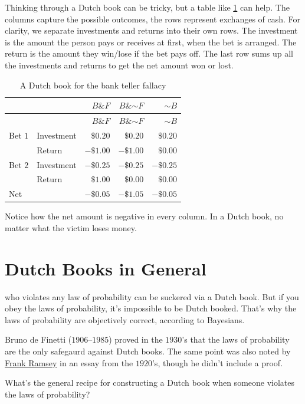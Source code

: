 \documentclass[justified]{tufte-book}
\renewcommand{\neg}{\mathbin{\sim}}
\renewcommand{\wedge}{\mathbin{\&}}
\theoremstyle{definition}
\theoremstyle{definition}
\theoremstyle{definition}
\theoremstyle{remark}
\begin{document}
Thinking through a Dutch book can be tricky, but a table like
\ref{tab:banktellerdb} can help. The columns capture the possible
outcomes, the rows represent exchanges of cash. For clarity, we separate
investments and returns into their own rows. The investment is the
amount the person pays or receives at first, when the bet is arranged.
The return is the amount they win/lose if the bet pays off. The last row
sums up all the investments and returns to get the net amount won or
lost.

\begin{longtable}[]{@{}llrrr@{}}
\caption{\label{tab:banktellerdb}A Dutch book for the bank teller
fallacy}\tabularnewline
\toprule
& & \(B \wedge F\) & \(B \wedge \neg F\) & \(\neg B\)\tabularnewline
\midrule
\endfirsthead
\toprule
& & \(B \wedge F\) & \(B \wedge \neg F\) & \(\neg B\)\tabularnewline
\midrule
\endhead
Bet \(1\) & Investment & \(\$0.20\) & \(\$0.20\) &
\(\$0.20\)\tabularnewline
& Return & \(-\$1.00\) & \(-\$1.00\) & \(\$0.00\)\tabularnewline
Bet \(2\) & Investment & \(-\$0.25\) & \(-\$0.25\) &
\(-\$0.25\)\tabularnewline
& Return & \(\$1.00\) & \(\$0.00\) & \(\$0.00\)\tabularnewline
Net & & \(-\$0.05\) & \(-\$1.05\) & \(-\$0.05\)\tabularnewline
\bottomrule
\end{longtable}

Notice how the net amount is negative in every column. In a Dutch book,
no matter what the victim loses money.

\hypertarget{dutch-books-in-general}{%
\section{Dutch Books in General}\label{dutch-books-in-general}}

 who violates any law of probability can be suckered
via a Dutch book. But if you obey the laws of probability, it's
impossible to be Dutch booked. That's why the laws of probability are
objectively correct, according to Bayesians.

\begin{marginfigure}
Bruno de Finetti (\(1906\)--\(1985\)) proved in the \(1930\)'s that the
laws of probability are the only safegaurd against Dutch books. The same
point was also noted by \protect\hyperlink{fig:ramsey}{Frank Ramsey} in
an essay from the \(1920\)'s, though he didn't include a proof.
\end{marginfigure}

What's the general recipe for constructing a Dutch book when someone
violates the laws of probability?
\end{document}
